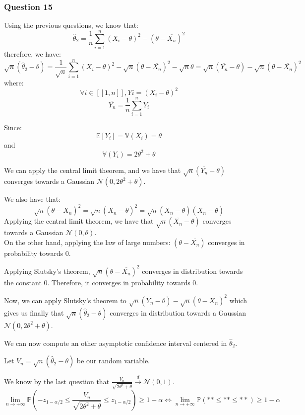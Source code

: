 \documentclass[]{article}
\begin{document}
\hypertarget{question-15}{%
\subsubsection{Question 15}\label{question-15}}

Using the previous questions, we know that:
\[\hat\theta_{2} = \frac{1}{n} \sum_{i=1}^{n} (X_i - \theta)^2 - (\theta - \overline{X_n})^2\]
therefore, we have: \[
\sqrt{n} (\hat\theta_{2} - \theta) = \frac{1}{\sqrt{n}} \sum_{i=1}^{n} (X_i - \theta)^2 - \sqrt{n} (\theta - \overline{X_n})^2 - \sqrt{n} \theta = \sqrt{n} (\overline{Y_n} - \theta) -  \sqrt{n} (\theta - \overline{X_n})^2
\] where: \[\forall i \in[\![1,n]\!], Yi = (X_i - \theta)^2 \]
\[\bar{Y_n} = \frac{1}{n} \sum_{i=1}^{n}Y_i \]

Since: \[
\mathbb{E}[Y_i] = \mathbb{V}(X_i) = \theta
\] and \[
\mathbb{V}(Y_i) = 2\theta^2 + \theta
\]

We can apply the central limit theorem, and we have that
\(\sqrt{n} (\overline{Y_n} - \theta)\) converges towards a Gaussian
\(\mathcal{N}(0,2\theta^2 + \theta)\).

We also have that: \[
\sqrt{n} (\theta - \overline{X_n})^2 = \sqrt{n} (\overline{X_n} - \theta)^2 = \sqrt{n} (\overline{X_n} - \theta)(\overline{X_n} - \theta)
\] Applying the central limit theorem, we have that
\(\sqrt{n} (\overline{X_n} - \theta)\) converges towards a Gaussian
\(\mathcal{N}(0,\theta)\).\\
On the other hand, applying the law of large numbers:
\((\theta - \overline{X_n})\) converges in probability towards 0.

Applying Slutsky's theorem, \(\sqrt{n} (\theta - \overline{X_n})^2\)
converges in distribution towards the constant 0. Therefore, it
converges in probability towards 0.

Now, we can apply Slutsky's theorem to
\(\sqrt{n} (\overline{Y_n} - \theta) - \sqrt{n} (\theta - \overline{X_n})^2\)
which gives us finally that \(\sqrt{n} (\hat\theta_{2} - \theta)\)
converges in distribution towards a Gaussian
\(\mathcal{N}(0,2\theta^2 + \theta)\).

We can now compute an other asymptotic confidence interval centered in
\(\hat \theta_2\).

Let \(V_n = \sqrt{n} (\hat\theta_{2} - \theta)\) be our random variable.

We know by the last question that
\(\frac{V_n}{\sqrt{2\theta^2 + \theta}} \overset{d} {\to} \mathcal{N}(0,1)\).
\[
\lim \limits_{n \rightarrow + \infty} \mathbb{P} (-z_{1-\alpha/2} \leq \frac{V_n}{\sqrt{2\theta^2 + \theta}} \leq z_{1-\alpha/2}) \geq 1- \alpha \Leftrightarrow \lim \limits_{n \rightarrow + \infty} \mathbb{P}(** \leq ** \leq **) \geq 1- \alpha
\]
\end{document}
